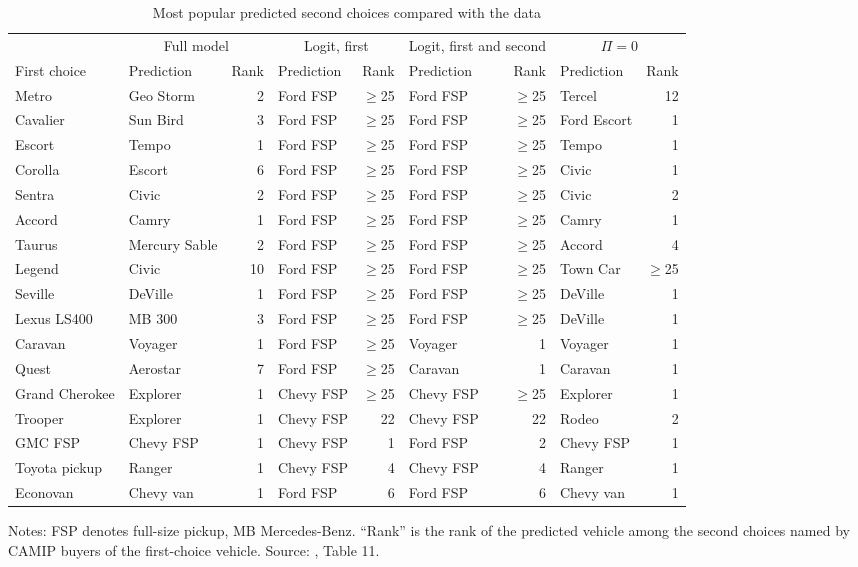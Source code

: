 \begin{table}[htbp]
\centering
\caption{Most popular predicted second choices compared with the data}
\label{tab:08-blp04-fit}
\footnotesize
\setlength{\tabcolsep}{3.5pt}
\begin{tabular}{@{}llrlrlrlr@{}}
\toprule
 & \multicolumn{2}{c}{Full model} & \multicolumn{2}{c}{Logit, first} & \multicolumn{2}{c}{Logit, first and
second} & \multicolumn{2}{c}{$\Pi = 0$} \\
\cmidrule(lr){2-3}\cmidrule(lr){4-5}\cmidrule(lr){6-7}\cmidrule(l){8-9}
First choice & Prediction & Rank & Prediction & Rank & Prediction & Rank & Prediction & Rank \\
\midrule
Metro & Geo Storm & 2 & Ford FSP & $\geq$25 & Ford FSP & $\geq$25 & Tercel & 12 \\
Cavalier & Sun Bird & 3 & Ford FSP & $\geq$25 & Ford FSP & $\geq$25 & Ford Escort & 1 \\
Escort & Tempo & 1 & Ford FSP & $\geq$25 & Ford FSP & $\geq$25 & Tempo & 1 \\
Corolla & Escort & 6 & Ford FSP & $\geq$25 & Ford FSP & $\geq$25 & Civic & 1 \\
Sentra & Civic & 2 & Ford FSP & $\geq$25 & Ford FSP & $\geq$25 & Civic & 2 \\
Accord & Camry & 1 & Ford FSP & $\geq$25 & Ford FSP & $\geq$25 & Camry & 1 \\
Taurus & Mercury Sable & 2 & Ford FSP & $\geq$25 & Ford FSP & $\geq$25 & Accord & 4 \\
Legend & Civic & 10 & Ford FSP & $\geq$25 & Ford FSP & $\geq$25 & Town Car & $\geq$25 \\
Seville & DeVille & 1 & Ford FSP & $\geq$25 & Ford FSP & $\geq$25 & DeVille & 1 \\
Lexus LS400 & MB 300 & 3 & Ford FSP & $\geq$25 & Ford FSP & $\geq$25 & DeVille & 1 \\
Caravan & Voyager & 1 & Ford FSP & $\geq$25 & Voyager & 1 & Voyager & 1 \\
Quest & Aerostar & 7 & Ford FSP & $\geq$25 & Caravan & 1 & Caravan & 1 \\
Grand Cherokee & Explorer & 1 & Chevy FSP & $\geq$25 & Chevy FSP & $\geq$25 & Explorer & 1 \\
Trooper & Explorer & 1 & Chevy FSP & 22 & Chevy FSP & 22 & Rodeo & 2 \\
GMC FSP & Chevy FSP & 1 & Chevy FSP & 1 & Ford FSP & 2 & Chevy FSP & 1 \\
Toyota pickup & Ranger & 1 & Chevy FSP & 4 & Chevy FSP & 4 & Ranger & 1 \\
Econovan & Chevy van & 1 & Ford FSP & 6 & Ford FSP & 6 & Chevy van & 1 \\
\bottomrule
\end{tabular}

\smallskip
\begin{minipage}{0.97\linewidth}
\footnotesize Notes: FSP denotes full-size pickup, MB Mercedes-Benz. ``Rank'' is the rank of the predicted
vehicle among the second choices named by CAMIP buyers of the first-choice vehicle. Source:
\citet{BerryLevinsohnPakes2004}, Table 11.
\end{minipage}
\end{table}

